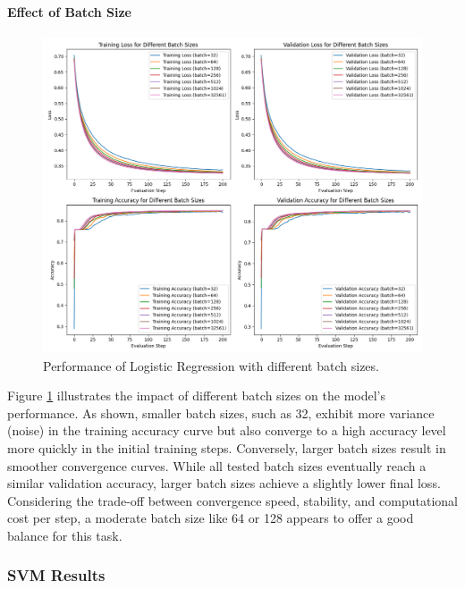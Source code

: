 \documentclass[journal, a4paper]{IEEEtran}
\begin{document}
\paragraph{Effect of Batch Size}
\begin{figure}[H]
\centering
\includegraphics[width=\linewidth]{logistic_regression_batch_sizes.png}
\caption{Performance of Logistic Regression with different batch sizes.}
\label{fig:lr_batch}
\end{figure}

Figure \ref{fig:lr_batch} illustrates the impact of different batch sizes on the model's performance. As shown, smaller batch sizes, such as 32, exhibit more variance (noise) in the training accuracy curve but also converge to a high accuracy level more quickly in the initial training steps. Conversely, larger batch sizes result in smoother convergence curves. While all tested batch sizes eventually reach a similar validation accuracy, larger batch sizes achieve a slightly lower final loss. Considering the trade-off between convergence speed, stability, and computational cost per step, a moderate batch size like 64 or 128 appears to offer a good balance for this task.

\subsubsection{SVM Results}
\end{document}
